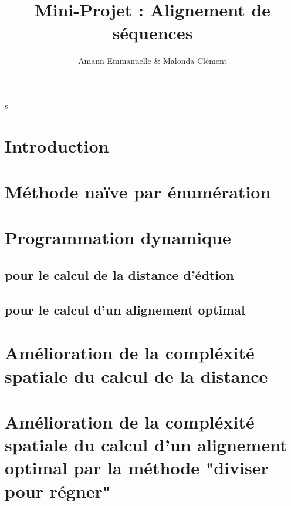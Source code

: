 \documentclass[12pt]{article}
\begin{document}
\title{Mini-Projet : Alignement de séquences}s
\author{Amann Emmanuelle \& Malonda Clément}
\date{}
\maketitle
\tableofcontents
\newpage

\section{Introduction}

\section{Méthode naïve par énumération}

\section{Programmation dynamique}
\subsection{pour le calcul de la distance d'édtion}
%
\subsection{pour le calcul d'un alignement optimal}
%
\section{Amélioration de la compléxité spatiale du calcul de la distance}
%
\section{Amélioration de la compléxité spatiale du calcul d'un alignement optimal par la méthode "diviser pour régner"}

\end{document}
